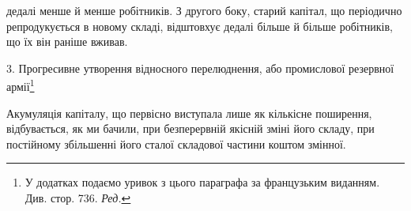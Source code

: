 \parcont{}  %
дедалі менше й менше робітників. З другого боку, старий капітал,
що періодично репродукується в новому складі, відштовхує
дедалі більше й більше робітників, що їх він раніше вживав.

3. Прогресивне утворення відносного перелюднення,
або промислової резервної армії\footnote*{
У додатках подаємо уривок з цього параграфа за французьким
виданням. Див. стор. 736. \emph{Ред.}
}

Акумуляція капіталу, що первісно виступала лише як кількісне
поширення, відбувається, як ми бачили, при безперервній
якісній зміні його складу, при постійному збільшенні його сталої
складової частини коштом змінної.

